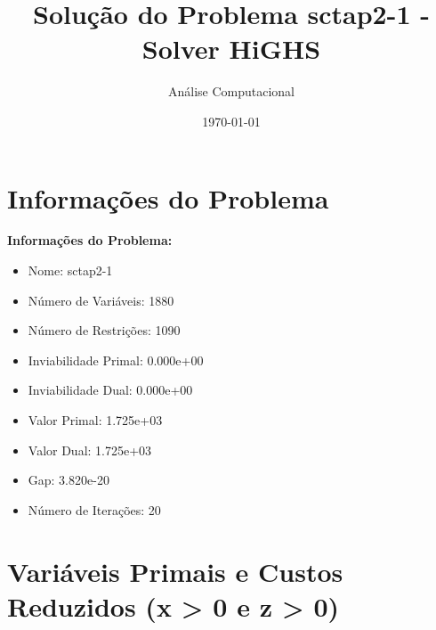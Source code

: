 \documentclass[12pt]{article}
\title{Solução do Problema sctap2-1 - Solver HiGHS}
\author{Análise Computacional}
\date{\today}
\begin{document}
\maketitle

\section{Informações do Problema}

\textbf{Informações do Problema:}
\begin{itemize}
\item Nome: sctap2-1
\item Número de Variáveis: 1880
\item Número de Restrições: 1090
\item Inviabilidade Primal: 0.000e+00
\item Inviabilidade Dual: 0.000e+00
\item Valor Primal: 1.725e+03
\item Valor Dual: 1.725e+03
\item Gap: 3.820e-20
\item Número de Iterações: 20
\end{itemize}


\section{Variáveis Primais e Custos Reduzidos (x > 0 e z > 0)}
\end{document}
